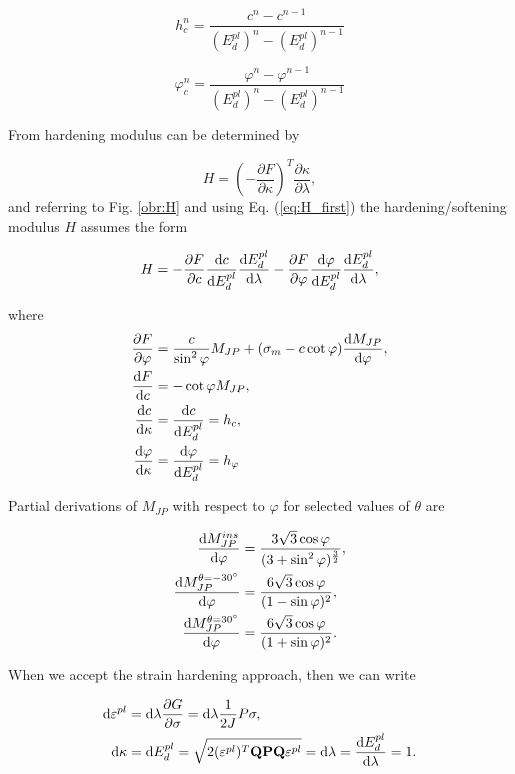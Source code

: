 \begin{equation}\label{eq:h_c}
	h_c^n = \dfrac{c^n-c^{n-1}}{(E_d^{pl})^{n}-(E_d^{pl})^{n-1}}
\end{equation}

\begin{equation}\label{eq:h_phi}
 	\varphi_c^n = \dfrac{\varphi^n-\varphi^{n-1}}{(E_d^{pl})^{n}-(E_d^{pl})^{n-1}}
\end{equation}

From \cite{geofem} hardening modulus can be determined by

\begin{equation}\label{eq:H_first}
	H = \left(-\dfrac{\partial F}{\partial \kappa}\right)^T \dfrac{\partial \kappa}{\partial \lambda},
\end{equation}
\newpage
and referring to Fig. \ref{obr:H} and using Eq. (\ref{eq:H_first}) the hardening/softening modulus $H$ assumes the form 

\begin{equation}\label{eq:H}
	H = - \pdv{F}{c} \dv{c}{E_d^{pl}} \dv{E_d^{pl}}{\lambda} - \pdv{F}{\varphi} \dv{\varphi}{E_d^{pl}} \dv{E_d^{pl}}{\lambda},
\end{equation}

where
\begin{align}
\pdv{F}{\varphi}& = \dfrac{c}{\sin^2\varphi} M_{JP} + (\sigma_m - c\cot \varphi) \dv{M_{JP}}{\varphi},\label{eq:F/phi}\\
\dv{F}{c}& = - \cot \varphi M_{JP},\\
\dv{c}{\kappa}& = \dv{c}{E_d^{pl}} = h_c,\\
\dv{\varphi}{\kappa}& = \dv{\varphi}{E_d^{pl}} = h_\varphi
\end{align}

Partial derivations of $M_{JP}$ with respect to $\varphi$ for selected values of $\theta$ are

\begin{align}
	\dv{M_{JP}^{ins}}{\varphi}					& = \dfrac{3\sqrt{3}\cos \varphi}{(3 + \sin^2 \varphi)^{\frac{3}{2}}},\\
	\dv{M_{JP}^{\theta = \ang{-30}}}{\varphi}	& = \dfrac{6\sqrt{3}\cos \varphi}{(1-\sin \varphi)^2},\\
	\dv{M_{JP}^{\theta = \ang{30}}}{\varphi}	& = \dfrac{6\sqrt{3}\cos \varphi}{(1+\sin \varphi)^2}.
\end{align}


When we accept the strain hardening approach, then we can write

\begin{align}
	\dd\varepsilon^{pl}& = \dd\lambda\pdv{G}{\sigma} = \dd\lambda\dfrac{1}{2J}P\sigma,\\
	\dd\kappa& = \dd E_d^{pl} = \sqrt{2(\varepsilon^{pl})^T \text{\textbf{QPQ}} \varepsilon^{pl} } = \dd \lambda = \dv{E_d^{pl}}{\lambda} = 1.\label{eq:dkappa}
\end{align}

